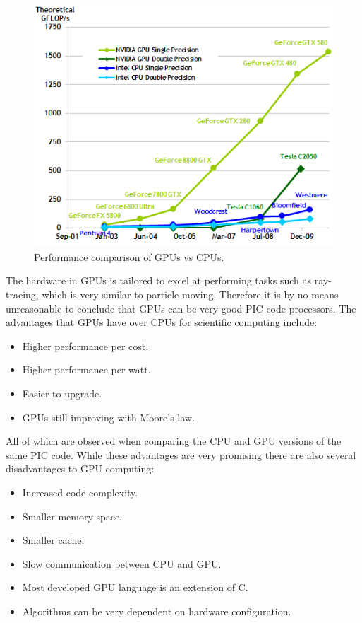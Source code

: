 \begin{figure}
\begin{center}
\includegraphics[width=5in]{introduction/gpu_vs_cpu.png}
\end{center}
\caption{Performance comparison of GPUs vs CPUs.}
\label{fig:gpu_vs_cpu}
\end{figure}

The hardware in GPUs is tailored to excel at performing tasks such as ray-tracing, which is very similar to particle moving. Therefore it is by no means unreasonable to conclude that GPUs can be very good PIC code processors. The advantages that GPUs have over CPUs for scientific computing include:

\begin{itemize}
	\item Higher performance per cost.
	\item Higher performance per watt.
	\item Easier to upgrade.
	\item GPUs still improving with Moore's law.
\end{itemize}

All of which are observed when comparing the CPU and GPU versions of the same PIC code. While these advantages are very promising there are also several disadvantages to GPU computing:

\begin{itemize}
	\item Increased code complexity.
	\item Smaller memory space.
	\item Smaller cache.
	\item Slow communication between CPU and GPU.
	\item Most developed GPU language is an extension of C.
	\item Algorithms can be very dependent on hardware configuration.
\end{itemize}

